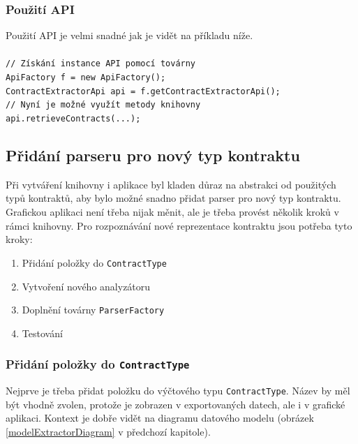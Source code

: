 			\subsubsection{Použití API}	    
				Použití API je velmi snadné jak je vidět na příkladu níže.\\\\
				\- \- \- \- \- \- \texttt{\textcolor{pgrey}{// Získání instance API pomocí továrny}}\\ 
				\- \- \- \- \- \- \texttt{ApiFactory f = new ApiFactory();}\\
	    		\- \- \- \- \- \- \texttt{ContractExtractorApi api = f.getContractExtractorApi();}\\  
            	\- \- \- \- \- \- \texttt{\textcolor{pgrey}{// Nyní je možné využít metody knihovny}}\\ 
				\- \- \- \- \- \- \texttt{api.retrieveContracts(...);}\\
	    
	    \subsection{Přidání parseru pro nový typ kontraktu}
	    	Při vytváření knihovny i aplikace byl kladen důraz na abstrakci od použitých typů kontraktů, aby bylo možné snadno přidat parser pro nový typ kontraktu. Grafickou aplikaci není třeba nijak měnit, ale je třeba provést několik kroků v rámci knihovny. Pro rozpoznávání nové reprezentace kontraktu jsou potřeba tyto kroky:
	    	
			\begin{enumerate}
				\item Přidání položky do \texttt{ContractType}
				\item Vytvoření nového analyzátoru
				\item Doplnění továrny \texttt{ParserFactory}
				\item Testování
			\end{enumerate}				    	
	    	
	    	\subsubsection{Přidání položky do \texttt{ContractType}}
	    		Nejprve je třeba přidat položku do výčtového typu \texttt{ContractType}. Název by měl být vhodně zvolen, protože je zobrazen v exportovaných datech, ale i v grafické aplikaci. Kontext je dobře vidět na diagramu datového modelu (obrázek \ref{modelExtractorDiagram} v předchozí kapitole).
	    		
